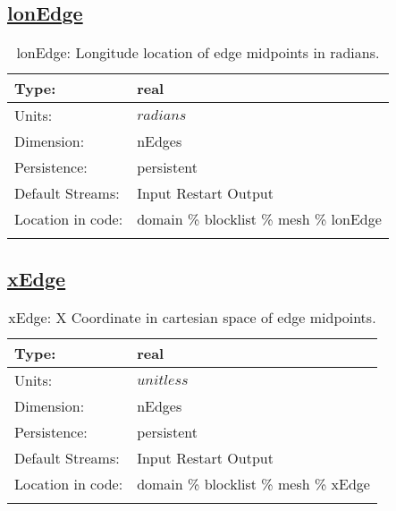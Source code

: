 \subsection[lonEdge]{\hyperref[sec:var_tab_mesh]{lonEdge}}
\label{subsec:var_sec_mesh_lonEdge}
\begin{center}
\begin{longtable}{| p{2.0in} | p{4.0in} |}
        \hline 
        Type: & real \\
        \hline 
        Units: & $radians$ \\
        \hline 
        Dimension: & nEdges \\
        \hline 
        Persistence: & persistent \\
        \hline 
		 Default Streams: & Input Restart Output  \\
        \hline 
		 Location in code: & domain \% blocklist \% mesh \% lonEdge \\
		 \hline 
    \caption{lonEdge: Longitude location of edge midpoints in radians.}
\end{longtable}
\end{center}
\subsection[xEdge]{\hyperref[sec:var_tab_mesh]{xEdge}}
\label{subsec:var_sec_mesh_xEdge}
\begin{center}
\begin{longtable}{| p{2.0in} | p{4.0in} |}
        \hline 
        Type: & real \\
        \hline 
        Units: & $unitless$ \\
        \hline 
        Dimension: & nEdges \\
        \hline 
        Persistence: & persistent \\
        \hline 
		 Default Streams: & Input Restart Output  \\
        \hline 
		 Location in code: & domain \% blocklist \% mesh \% xEdge \\
		 \hline 
    \caption{xEdge: X Coordinate in cartesian space of edge midpoints.}
\end{longtable}
\end{center}

